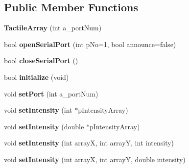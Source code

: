 \subsection*{Public Member Functions}
\begin{DoxyCompactItemize}
\item 
\hypertarget{classTactileArray_acbfafee94d72b978ace17f08167fc036}{
{\bfseries TactileArray} (int a\_\-portNum)}
\label{classTactileArray_acbfafee94d72b978ace17f08167fc036}

\item 
\hypertarget{classTactileArray_aeadf3a68daab9c158a108a15debb28b8}{
bool {\bfseries openSerialPort} (int pNo=1, bool announce=false)}
\label{classTactileArray_aeadf3a68daab9c158a108a15debb28b8}

\item 
\hypertarget{classTactileArray_a3dd4969a067bd024a98fa9e99e40e971}{
bool {\bfseries closeSerialPort} ()}
\label{classTactileArray_a3dd4969a067bd024a98fa9e99e40e971}

\item 
\hypertarget{classTactileArray_ab8b3c1326d810855cde7422c93279dd1}{
bool {\bfseries initialize} (void)}
\label{classTactileArray_ab8b3c1326d810855cde7422c93279dd1}

\item 
\hypertarget{classTactileArray_afa6e34c93e1311edce551539831e0982}{
void {\bfseries setPort} (int a\_\-portNum)}
\label{classTactileArray_afa6e34c93e1311edce551539831e0982}

\item 
\hypertarget{classTactileArray_a62f715d4171c021a1d22ae67b2cb121d}{
void {\bfseries setIntensity} (int $\ast$pIntensityArray)}
\label{classTactileArray_a62f715d4171c021a1d22ae67b2cb121d}

\item 
\hypertarget{classTactileArray_a9d537a2423b2cba35badcca3468593f0}{
void {\bfseries setIntensity} (double $\ast$pIntensityArray)}
\label{classTactileArray_a9d537a2423b2cba35badcca3468593f0}

\item 
\hypertarget{classTactileArray_a57f15c2bbd18cbbdf2fe59d8a550d8a5}{
void {\bfseries setIntensity} (int arrayX, int arrayY, int intensity)}
\label{classTactileArray_a57f15c2bbd18cbbdf2fe59d8a550d8a5}

\item 
\hypertarget{classTactileArray_a8e84527dac8a4b36ac8dbddf50a4c855}{
void {\bfseries setIntensity} (int arrayX, int arrayY, double intensity)}
\label{classTactileArray_a8e84527dac8a4b36ac8dbddf50a4c855}


\end{DoxyCompactItemize}
